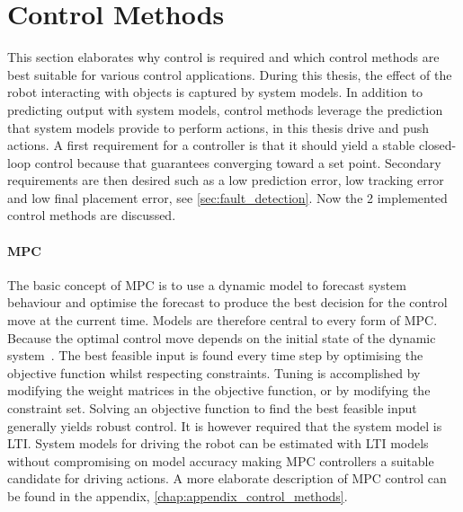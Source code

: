 \section{Control Methods}%
\label{sec:control_methods}
This section elaborates why control is required and which control methods are best suitable for various control applications. During this thesis, the effect of the robot interacting with objects is captured by system models. In addition to predicting output with system models, control methods leverage the prediction that system models provide to perform actions, in this thesis drive and push actions. A first requirement for a controller is that it should yield a stable closed-loop control because that guarantees converging toward a set point. Secondary requirements are then desired such as a low prediction error, low tracking error and low final placement error, see \cref{sec:fault_detection}. Now the 2 implemented control methods are discussed.\bs

\paragraph{\acl{MPC}}
The basic concept of \ac{MPC} is to use a dynamic model to forecast system behaviour and optimise the forecast to produce the best decision for the control move at the current time. Models are therefore central to every form of \ac{MPC}. Because the optimal control move depends on the initial state of the dynamic system~\cite{rawlings_model_2020}. The best feasible input is found every time step by optimising the objective function whilst respecting constraints. Tuning is accomplished by modifying the weight matrices in the objective function, or by modifying the constraint set. Solving an objective function to find the best feasible input generally yields robust control. It is however required that the system model is \ac{LTI}. System models for driving the robot can be estimated with \ac{LTI} models without compromising on model accuracy making \ac{MPC} controllers a suitable candidate for driving actions. A more elaborate description of \ac{MPC} control can be found in the appendix, \cref{chap:appendix_control_methods}.

